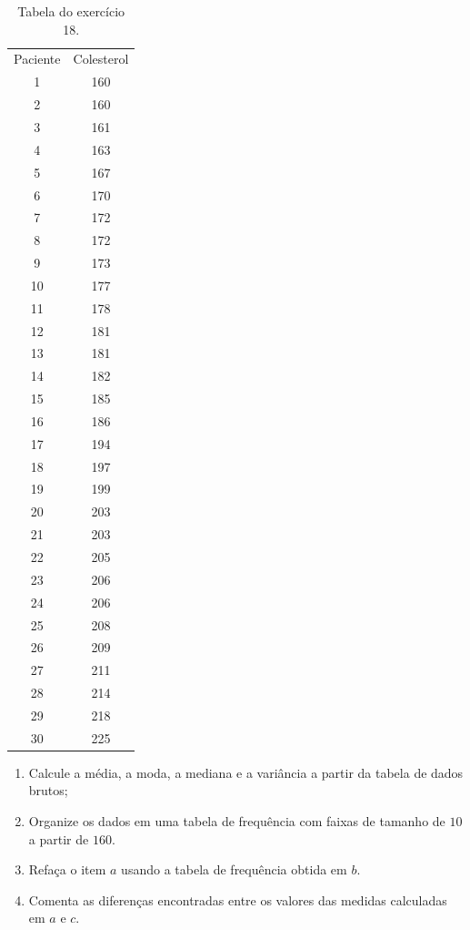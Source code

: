 \documentclass[oneside,a4paper,12pt]{article}
\begin{document}
\begin{enumerate}
	\begin{table}[h!]
		\centering
		\begin{tabular}{|c|c|}
			\hline
			Paciente	&	Colesterol	\\
			1	&	160	\\
			2	&	160	\\
			3	&	161	\\
			4	&	163	\\
			5	&	167	\\
			6	&	170	\\
			7	&	172	\\
			8	&	172	\\
			9	&	173	\\
			10	&	177	\\
			11	&	178	\\
			12	&	181	\\
			13	&	181	\\
			14	&	182	\\
			15	&	185	\\
			16	&	186	\\
			17	&	194	\\
			18	&	197	\\
			19	&	199	\\
			20	&	203	\\
			21	&	203	\\
			22	&	205	\\
			23	&	206	\\
			24	&	206	\\
			25	&	208	\\
			26	&	209	\\
			27	&	211	\\
			28	&	214	\\
			29	&	218	\\
			30	&	225	\\
			\hline
		\end{tabular}
		\caption{Tabela do exercício 18.}
	\end{table}

	\begin{enumerate}
		\item Calcule a média, a moda, a mediana e a variância a partir da tabela de dados brutos;
		\item Organize os dados em uma tabela de frequência com faixas de tamanho de $10$ a partir de $160$.
		\item Refaça o item $a$ usando a tabela de frequência obtida em $b$.
		\item Comenta as diferenças encontradas entre os valores das medidas calculadas em $a$ e $c$.
	\end{enumerate}


\end{enumerate}
\end{document}
